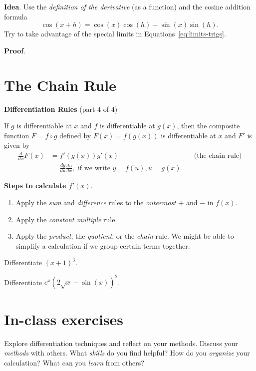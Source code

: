 \documentclass[../main.tex]{subfiles}
\begin{document}
\textbf{Idea}. Use the \emph{definition of the derivative} (as a function) and the cosine addition formula
\begin{equation} \label{eq:cos-addition}
  \cos(x + h) = \cos(x) \cos(h) - \sin(x) \sin(h).
\end{equation}
Try to take advantage of the special limits in Equations~\eqref{eq:limits-trigs}.

\bigskip
\textbf{Proof}.  
\clearpage

\section{The Chain Rule}
\begin{mdframed}[style=simple]
  \textbf{Differentiation Rules} \hfill {\footnotesize (part \(4\) of \(4\))}

  If \(g\) is differentiable at \(x\) and \(f\) is differentiable at \(g(x)\), then the composite function \(F = f \circ g\) defined by \(F(x) = f(g(x))\) is differentiable at \(x\) and \(F'\) is given by 
  \begin{align*}
    \frac{d}{dx} F(x) 
    &= f'(g(x)) g'(x)
    &&\text{(the chain rule)}\\[1em]
    &= \frac{dy}{du} \frac{du}{dx}, \text{ if we write } y = f(u), u = g(x).
  \end{align*}
\end{mdframed}

\textbf{Steps to calculate \(f'(x)\)}.
\begin{enumerate}[label=(\arabic*)]
  \item Apply the \emph{sum} and \emph{difference} rules to the \emph{outermost} \(+\) and \(-\) in \(f(x)\). 
  \item Apply the \emph{constant multiple} rule.
  \item Apply the \emph{product}, the \emph{quotient}, or the \emph{chain} rule. We might be able to simplify a calculation if we group certain terms together. 
\end{enumerate}
\bigskip

\begin{example}
  Differentiate \((x+1)^{3}\).
\end{example}


\clearpage

\begin{example}
  Differentiate \(e^{x}(2\sqrt{x} - \sin(x))^{2}\).
\end{example}
\clearpage

\section{In-class exercises}
Explore differentiation techniques and reflect on your methods. Discuss your \emph{methods} with others. What \emph{skills} do you find helpful? How do you \emph{organize} your calculation? What can you \emph{learn} from others?
\end{document}
